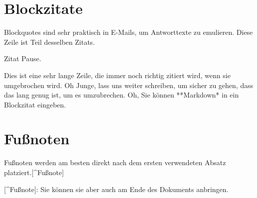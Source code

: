 \documentclass[12pt,de-CH,twoside,openright]{report}
\newenvironment{Shaded}{\begin{snugshade}}{\end{snugshade}}
\newcommand{\BaseNTok}[1]{\textcolor[rgb]{0.00,0.00,0.81}{#1}}
\newcommand{\NormalTok}[1]{#1}
\newcommand{\OtherTok}[1]{\textcolor[rgb]{0.56,0.35,0.01}{#1}}
\begin{document}
\begin{Shaded}
\end{Shaded}

\hypertarget{blockzitate}{%
\section{Blockzitate}\label{blockzitate}}

\begin{Shaded}
\begin{Highlighting}[]
\NormalTok{Blockquotes sind sehr praktisch in E-Mails, um Antworttexte zu emulieren.}
\NormalTok{Diese Zeile ist Teil desselben Zitats.}

\NormalTok{Zitat Pause.}

\NormalTok{Dies ist eine sehr lange Zeile, die immer noch richtig zitiert wird, wenn sie umgebrochen wird. Oh Junge, lass uns weiter schreiben, um sicher zu gehen, dass das lang genug ist, um es umzubrechen. Oh, Sie können **Markdown* in ein Blockzitat eingeben.}
\end{Highlighting}
\end{Shaded}

\hypertarget{funoten}{%
\section{Fußnoten}\label{funoten}}

\begin{Shaded}
\begin{Highlighting}[]
\NormalTok{Fußnoten werden am besten direkt nach dem ersten verwendeten Absatz platziert.}\OtherTok{[^Fußnote]}

\OtherTok{[^Fußnote]}\NormalTok{: Sie können sie aber auch am Ende des Dokuments anbringen.}
\end{Highlighting}
\end{Shaded}
\end{document}
